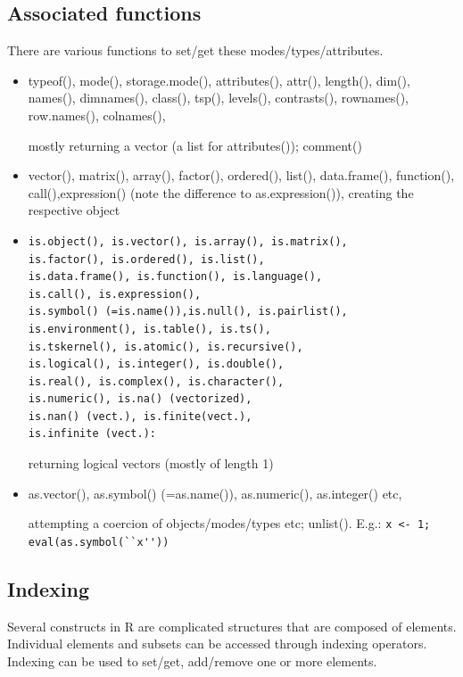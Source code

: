 \subsection{Associated functions}
\label{sec:associated-functions}

There are various functions to set/get these modes/types/attributes.

\begin{itemize}
\item typeof(), mode(), storage.mode(), attributes(), attr(),
  length(), dim(), names(), dimnames(), class(), tsp(), levels(),
  contrasts(), rownames(), row.names(), colnames(), 

  mostly returning a vector (a list for attributes()); comment()

\item vector(), matrix(), array(), factor(), ordered(), list(),
  data.frame(), function(), call(),expression() (note the difference
  to as.expression()), creating the respective object

\item 
\begin{lstlisting}
is.object(), is.vector(), is.array(), is.matrix(), 
is.factor(), is.ordered(), is.list(), 
is.data.frame(), is.function(), is.language(), 
is.call(), is.expression(), 
is.symbol() (=is.name()),is.null(), is.pairlist(), 
is.environment(), is.table(), is.ts(),
is.tskernel(), is.atomic(), is.recursive(), 
is.logical(), is.integer(), is.double(), 
is.real(), is.complex(), is.character(),
is.numeric(), is.na() (vectorized), 
is.nan() (vect.), is.finite(vect.), 
is.infinite (vect.): 
\end{lstlisting}
  returning logical vectors (mostly of length 1)

\item as.vector(), as.symbol() (=as.name()), as.numeric(),
  as.integer() etc, 

  attempting a coercion of objects/modes/types etc; unlist(). E.g.:
  \lstinline!x <- 1; eval(as.symbol(``x''))!
\end{itemize}

\subsection{Indexing}
\label{sec:indexing}

Several constructs in R are complicated structures that are composed
of elements. Individual elements and subsets can be accessed through
indexing operators. Indexing can be used to set/get, add/remove one or
more elements.

